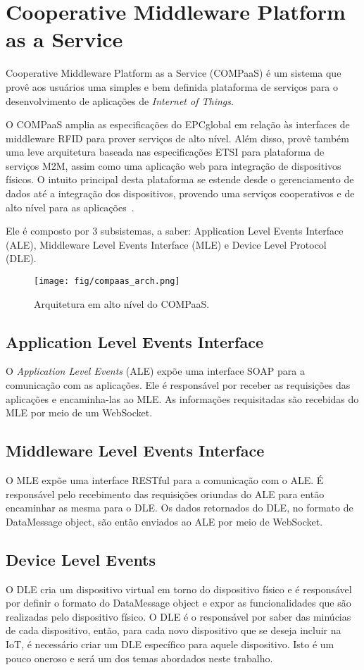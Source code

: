 \section{Cooperative Middleware Platform as a Service}
\label{sec:COMPaaS}
Cooperative Middleware Platform as a Service (COMPaaS) é um sistema que provê aos usuários uma simples e bem
definida plataforma de serviços para o desenvolvimento de aplicações de \textit{Internet of Things}.

O COMPaaS amplia as especificações do EPCglobal em relação às interfaces de middleware RFID para
prover serviços de alto nível. Além disso, provê também uma leve arquitetura baseada nas especificações
ETSI para plataforma de serviços M2M, assim como uma aplicação web para integração de dispositivos físicos.
O intuito principal desta plataforma se estende desde o gerenciamento de dados até a integração dos
dispositivos, provendo uma serviços cooperativos e de alto nível para as aplicações~\cite{COMPaaS}.

Ele é composto por 3 subsistemas, a saber:  Application Level Events
Interface (ALE), Middleware Level Events Interface (MLE) e Device Level Protocol (DLE).

\begin{figure}[H]
	\centering
		\texttt{[image: fig/compaas\_arch.png]}
	\caption{Arquitetura em alto nível do COMPaaS.}
\end{figure}

\subsection{Application Level Events Interface}
O \textit{Application Level Events} (ALE) expõe uma interface SOAP para a comunicação com as aplicações.
Ele é responsável por receber as requisições das aplicações e encaminha-las ao MLE. As informações
requisitadas são recebidas do MLE por meio de um WebSocket.

\subsection{Middleware Level Events Interface}
O MLE expõe uma interface RESTful para a comunicação com o ALE. É responsável pelo recebimento das requisições
oriundas do ALE para então encaminhar as mesma para o DLE. Os dados retornados do DLE, no formato de DataMessage
object, são então enviados ao ALE por meio de WebSocket.

\subsection{Device Level Events}
O DLE cria um dispositivo virtual em torno do dispositivo físico e é responsável por definir o formato do DataMessage
object e expor as funcionalidades que são realizadas pelo dispositivo físico. O DLE é o responsável por saber das
minúcias de cada dispositivo, então, para cada novo dispositivo que se deseja incluir na IoT, é necessário criar
um DLE específico para aquele dispositivo. Isto é um pouco oneroso e será um dos temas abordados neste trabalho.
